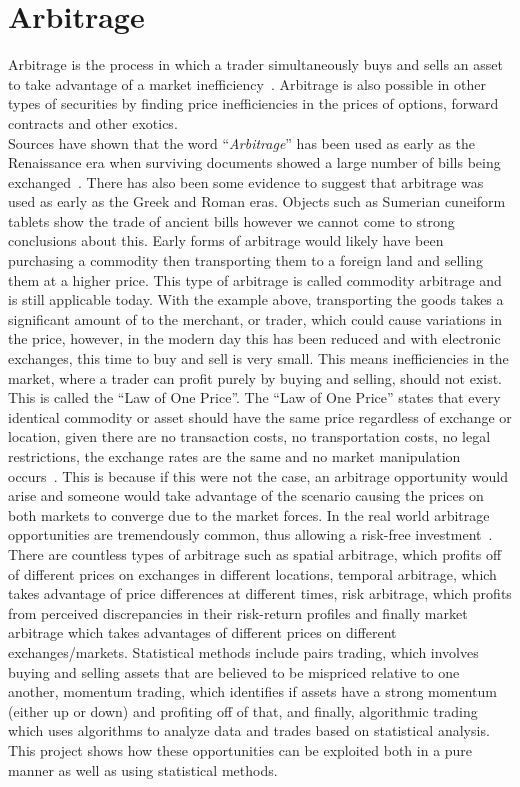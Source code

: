\section{Arbitrage}
Arbitrage is the process in which a trader simultaneously buys and sells an asset to take advantage of a market inefficiency~\cite{businessinsightsblog_2021}. Arbitrage is also possible in other types of securities by finding price inefficiencies in the prices of options, forward contracts and other exotics.
\\[5mm]
Sources have shown that the word ``\textit{Arbitrage}'' has been used as early as the Renaissance era when surviving documents showed a large number of bills being exchanged~\cite{poitras_2021}. There has also been some evidence to suggest that arbitrage was used as early as the Greek and Roman eras. Objects such as Sumerian cuneiform tablets show the trade of ancient bills however we cannot come to strong conclusions about this. Early forms of arbitrage would likely have been purchasing a commodity then transporting them to a foreign land and selling them at a higher price. This type of arbitrage is called commodity arbitrage and is still applicable today. With the example above, transporting the goods takes a significant amount of to the merchant, or trader, which could cause variations in the price, however, in the modern day this has been reduced and with electronic exchanges, this time to buy and sell is very small. This means inefficiencies in the market, where a trader can profit purely by buying and selling, should not exist. This is called the ``Law of One Price''. The ``Law of One Price'' states that every identical commodity or asset should have the same price regardless of exchange or location, given there are no transaction costs, no transportation costs, no legal restrictions, the exchange rates are the same and no market manipulation occurs~\cite{noauthor_law_nodate}. This is because if this were not the case, an arbitrage opportunity would arise and someone would take advantage of the scenario causing the prices on both markets to converge due to the market forces. In the real world arbitrage opportunities are tremendously common, thus allowing a risk-free investment~\cite{10.2307/1828075, RICHARDSON1978341}.
\\[5mm]
There are countless types of arbitrage such as spatial arbitrage, which profits off of different prices on exchanges in different locations, temporal arbitrage, which takes advantage of price differences at different times, risk arbitrage, which profits from perceived discrepancies in their risk-return profiles and finally market arbitrage which takes advantages of different prices on different exchanges/markets. Statistical methods include pairs trading, which involves buying and selling assets that are believed to be mispriced relative to one another, momentum trading, which identifies if assets have a strong momentum (either up or down) and profiting off of that, and finally, algorithmic trading which uses algorithms to analyze data and trades based on statistical analysis. This project shows how these opportunities can be exploited both in a pure manner as well as using statistical methods.

